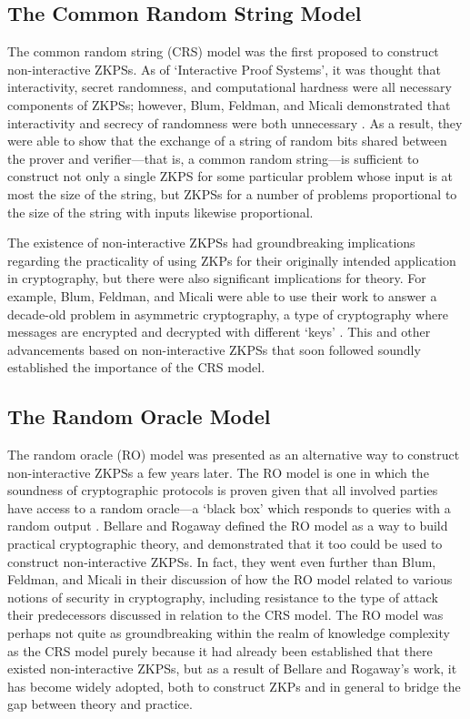 \documentclass{article}
\begin{document}
\begin{adjustwidth}{0.5in}{0in}
\subsection{The Common Random String Model}

The common random string (CRS) model was the first proposed to construct non-interactive ZKPSs. As of `Interactive Proof Systems', it was thought that interactivity, secret randomness, and computational hardness were all necessary components of ZKPSs; however, Blum, Feldman, and Micali demonstrated that interactivity and secrecy of randomness were both unnecessary \cite{BFM}. As a result, they were able to show that the exchange of a string of random bits shared between the prover and verifier---that is, a common random string---is sufficient to construct not only a single ZKPS for some particular problem whose input is at most the size of the string, but ZKPSs for a number of problems proportional to the size of the string with inputs likewise proportional.

The existence of non-interactive ZKPSs had groundbreaking implications regarding the practicality of using ZKPs for their originally intended application in cryptography, but there were also significant implications for theory. For example, Blum, Feldman, and Micali were able to use their work to answer a decade-old problem in asymmetric cryptography, a type of cryptography where messages are encrypted and decrypted with different `keys' \cite{BFM}. This and other advancements based on non-interactive ZKPSs that soon followed soundly established the importance of the CRS model.


\subsection{The Random Oracle Model}

The random oracle (RO) model was presented as an alternative way to construct non-interactive ZKPSs a few years later. The RO model is one in which the soundness of cryptographic protocols is proven given that all involved parties have access to a random oracle---a `black box' which responds to queries with a random output \cite{BR}. Bellare and Rogaway defined the RO model as a way to build practical cryptographic theory, and demonstrated that it too could be used to construct non-interactive ZKPSs. In fact, they went even further than Blum, Feldman, and Micali in their discussion of how the RO model related to various notions of security in cryptography, including resistance to the type of attack their predecessors discussed in relation to the CRS model. The RO model was perhaps not quite as groundbreaking within the realm of knowledge complexity as the CRS model purely because it had already been established that there existed non-interactive ZKPSs, but as a result of Bellare and Rogaway's work, it has become widely adopted, both to construct ZKPs and in general to bridge the gap between theory and practice.
\end{adjustwidth} \vspace{0.15in}
\end{document}
